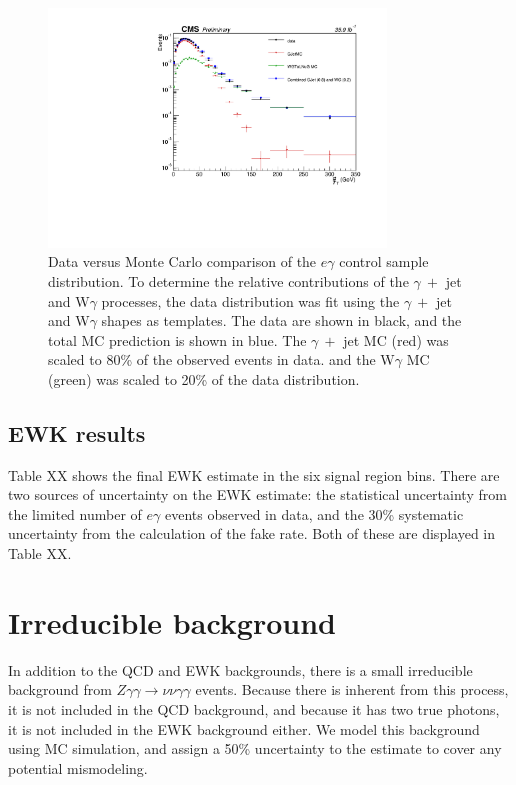 \begin{figure}[h!]
	\centering
	\includegraphics[width=0.8\textwidth]{Figures/DataAnalysis/dataMC_EG.pdf}
       \caption{Data versus Monte Carlo comparison of the $e\gamma$ control sample \ETmiss distribution. To determine the relative contributions of the
       $\gamma~+$ jet and W$\gamma$ processes, the data distribution was fit using the $\gamma~+$ jet and W$\gamma$ shapes as templates. The data
       are shown in black, and the total MC prediction is shown in blue. The $\gamma~+$ jet MC (red) was scaled to 80\% of the observed events in data. and 
       the W$\gamma$ MC (green) was scaled to 20\% of the data distribution.
	}
   	\label{fig:CMS}
\end{figure}


\subsection{EWK results}
\label{sec:EWKresults}

Table XX shows the final EWK estimate in the six signal region bins. There are two sources of uncertainty on the EWK estimate: the statistical uncertainty from the limited number of $e\gamma$ events observed in data, and the 30\% systematic uncertainty from the calculation of the fake rate. Both of these are displayed in Table XX.


\section{Irreducible background}
\label{sec:Zgg}

In addition to the QCD and EWK backgrounds, there is a small irreducible background from $Z\gamma\gamma\rightarrow\nu\nu\gamma\gamma$ events. Because there is inherent \ETmiss from this process, it is not included in the QCD background, and because it has two true photons, it is not included in the EWK background either. We model this background using MC simulation, and assign a 50\% uncertainty to the estimate to cover any potential mismodeling. 

